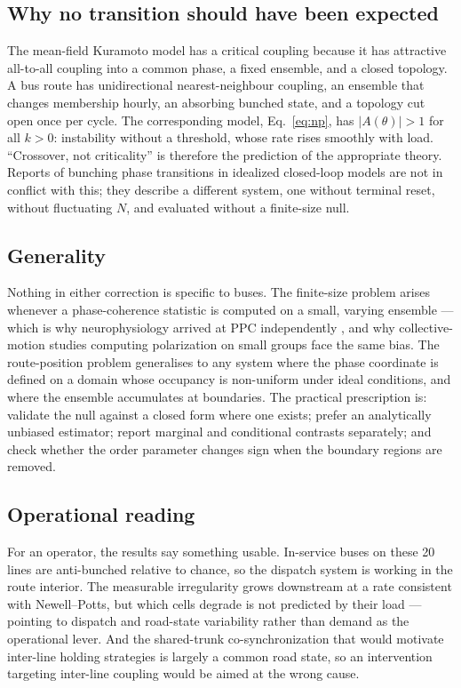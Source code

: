 \documentclass[9pt,twocolumn,twoside]{opticajnl}
\begin{document}
\subsection{Why no transition should have been expected}

The mean-field Kuramoto model has a critical coupling because it has attractive all-to-all
coupling into a common phase, a fixed ensemble, and a closed topology. A bus route has
unidirectional nearest-neighbour coupling, an ensemble that changes membership hourly, an
absorbing bunched state, and a topology cut open once per cycle. The corresponding model,
Eq.~\eqref{eq:np}, has $|A(\theta)| > 1$ for all $k > 0$: instability without a threshold, whose
rate rises smoothly with load. ``Crossover, not criticality'' is therefore the prediction of the
appropriate theory. Reports of bunching phase transitions in idealized closed-loop models
\cite{nagatani01} are not in conflict with this; they describe a different system, one without
terminal reset, without fluctuating $N$, and evaluated without a finite-size null.

\subsection{Generality}

Nothing in either correction is specific to buses. The finite-size problem arises whenever a
phase-coherence statistic is computed on a small, varying ensemble --- which is why
neurophysiology arrived at PPC independently \cite{vinck10}, and why collective-motion studies
computing polarization on small groups face the same bias. The route-position problem generalises
to any system where the phase coordinate is defined on a domain whose occupancy is non-uniform
under ideal conditions, and where the ensemble accumulates at boundaries. The practical
prescription is: validate the null against a closed form where one exists; prefer an
analytically unbiased estimator; report marginal and conditional contrasts separately; and check
whether the order parameter changes sign when the boundary regions are removed.

\subsection{Operational reading}

For an operator, the results say something usable. In-service buses on these 20 lines are
anti-bunched relative to chance, so the dispatch system is working in the route interior. The
measurable irregularity grows downstream at a rate consistent with Newell--Potts, but which cells
degrade is not predicted by their load --- pointing to dispatch and road-state variability rather
than demand as the operational lever. And the shared-trunk co-synchronization that would motivate
inter-line holding strategies is largely a common road state, so an intervention targeting
inter-line coupling would be aimed at the wrong cause.
\end{document}
